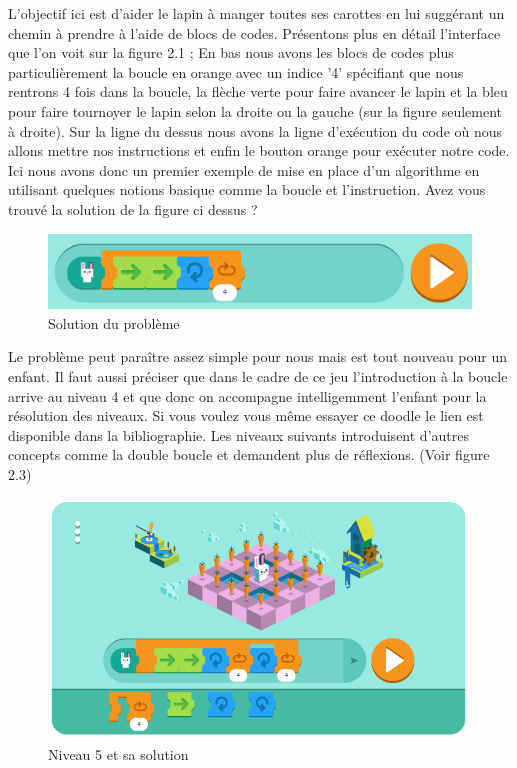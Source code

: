 L'objectif ici est d'aider le lapin à manger toutes ses carottes en lui suggérant un chemin à prendre à l'aide de blocs de codes. Présentons plus en détail l'interface que l'on voit sur la figure 2.1 ; En bas nous avons les blocs de codes plus particulièrement la boucle en orange avec un indice '4' spécifiant que nous rentrons 4 fois dans la boucle, la flèche verte pour faire avancer le lapin et la bleu pour faire tournoyer le lapin selon la droite ou la gauche (sur la figure seulement à droite). Sur la ligne du dessus nous avons la ligne d'exécution du code où nous allons mettre nos instructions et enfin le bouton orange pour exécuter notre code. Ici nous avons donc un premier exemple de mise en place d'un algorithme en utilisant quelques notions basique comme la boucle et l'instruction. Avez vous trouvé la solution de la figure ci dessus ?

\newpage

\begin{figure}[!htb]
  \centering
  \includegraphics[width=115mm,scale=0.5]{images/soluce2.PNG}
  \caption{Solution du problème}
  \label{fig:boat1}
\end{figure}

Le problème peut paraître assez simple pour nous mais est tout nouveau pour un enfant. Il faut aussi préciser que dans le cadre de ce jeu l'introduction à la boucle arrive au niveau 4 et que donc on accompagne intelligemment l'enfant pour la résolution des niveaux. Si vous voulez vous même essayer ce doodle le lien est disponible dans la bibliographie. Les niveaux suivants introduisent d'autres concepts comme la double boucle et demandent plus de réflexions. (Voir figure 2.3)

\begin{figure}[!htb]
  \centering
  \includegraphics[width=115mm,scale=0.5]{images/soluce3.PNG}
  \caption{Niveau 5 et sa solution}
  \label{fig:boat1}
\end{figure}

